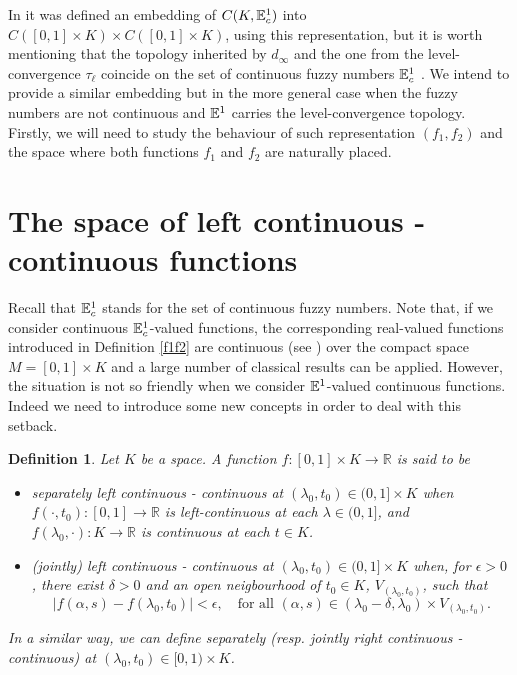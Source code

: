 \documentclass{amsart}
\newtheorem{definition}[theorem]{Definition}
\newcommand{\R}{{\mathbb{R}}}
\newcommand{\fn}{\mathbb{E}\sp{1}}
\begin{document}
In \cite{ACA:13} it was defined an embedding of $C(K,\fn_{c})$ into $C([0,1]\times K)\times C([0,1]\times K)$, using  this representation, but it is worth mentioning that  the topology  inherited by $d_{\infty}$ and  the one from the level-convergence $\tau_{\ell}$ coincide on the set of continuous fuzzy numbers $\fn_{c}$ . We intend to provide a similar embedding but in the more general case when the fuzzy numbers are not continuous and $\fn$ carries the level-convergence topology. Firstly, we will need to study the behaviour of such  representation $(f_1,f_2)$ and the space where both functions $f_1$ and $f_2$ are naturally placed.


\section{The space of left continuous - continuous functions}
\label{sec:LCC}

Recall that $\fn_{c}$ stands for the set of continuous fuzzy numbers. Note that, if we consider continuous $\fn_{c}$-valued functions, the corresponding real-valued functions introduced in Definition \ref{f1f2} are continuous (see \cite{chen}) over the compact space $M=[0,1]\times K$ and a large number of classical results can be applied.
However, the situation is not so friendly when we consider  $\fn$-valued continuous functions. Indeed we need to introduce some new concepts in order to deal with this setback.

\begin{definition}
Let $K$ be a space. A function $f:[0,1]\times K\rightarrow \R$ is said to be
\begin{itemize}
\item
 {\em separately left continuous - continuous} at $(\lambda_0,t_0)\in(0,1]\times K$ when  $f(\cdot,t_0):[0,1]\rightarrow\R$ is left-continuous at each $\lambda\in(0,1]$, and
$f(\lambda_0,\cdot):K\rightarrow \R$ is continuous at each $t\in K$.

\medskip
\item {\em (jointly) left continuous - continuous} at $(\lambda_0,t_0)\in(0,1]\times K$ when,
for $\epsilon>0$ , there exist $\delta>0$ and an open neigbourhood  of $t_0\in K$, $V_{(\lambda_0,t_0)}$, such that
$$|f(\alpha,s)-f(\lambda_0,t_0)|<\epsilon, \quad\text{for all } (\alpha,s) \in (\lambda_0-\delta,\lambda_0)\times V_{(\lambda_0,t_0)}.$$
\end{itemize}
In a similar way, we can define {\em separately} (resp. {\em jointly  right continuous - continuous}) at $(\lambda_0,t_0)\in[0,1)\times K$.
\end{definition}
\end{document}
